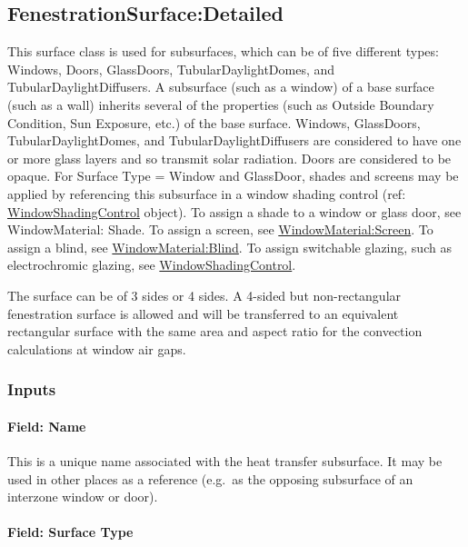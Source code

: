 \subsection{FenestrationSurface:Detailed}\label{fenestrationsurfacedetailed}

This surface class is used for subsurfaces, which can be of five different types: Windows, Doors, GlassDoors, TubularDaylightDomes, and TubularDaylightDiffusers. A subsurface (such as a window) of a base surface (such as a wall) inherits several of the properties (such as Outside Boundary Condition, Sun Exposure, etc.) of the base surface. Windows, GlassDoors, TubularDaylightDomes, and TubularDaylightDiffusers are considered to have one or more glass layers and so transmit solar radiation. Doors are considered to be opaque. For Surface Type = Window and GlassDoor, shades and screens may be applied by referencing this subsurface in a window shading control (ref: \hyperref[windowpropertyshadingcontrol]{WindowShadingControl} object). To assign a shade to a window or glass door, see WindowMaterial: Shade. To assign a screen, see \hyperref[windowmaterialscreen]{WindowMaterial:Screen}. To assign a blind, see \hyperref[windowmaterialblind]{WindowMaterial:Blind}. To assign switchable glazing, such as electrochromic glazing, see \hyperref[windowpropertyshadingcontrol]{WindowShadingControl}.

The surface can be of 3 sides or 4 sides. A 4-sided but non-rectangular fenestration surface is allowed and will be transferred to an equivalent rectangular surface with the same area and aspect ratio for the convection calculations at window air gaps.

\subsubsection{Inputs}\label{inputs-24-004}

\paragraph{Field: Name}\label{field-name-20-004}

This is a unique name associated with the heat transfer subsurface. It may be used in other places as a reference (e.g.~as the opposing subsurface of an interzone window or door).

\paragraph{Field: Surface Type}\label{field-surface-type-2016-06-16}

